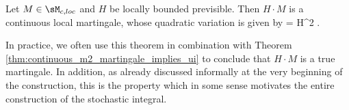 
\begin{theorem}\label{thm:stochastic_integral_local_martingale_quadratic_variation}
Let $M \in \sM_{c,loc}$ and $H$ be locally bounded previsible. Then $H \cdot M$ is a continuous local martingale, whose quadratic variation is given by
\be
[H \cdot M] = H^2 \cdot [M].
\ee
\end{theorem}

\begin{remark}
In practice, we often use this theorem in combination with Theorem \ref{thm:continuous_m2_martingale_implies_ui} to conclude that $H \cdot M$ is a true martingale. In addition, as already discussed informally at the very beginning of the construction, this is the property which in some sense motivates the entire construction of the stochastic integral.
\end{remark}

